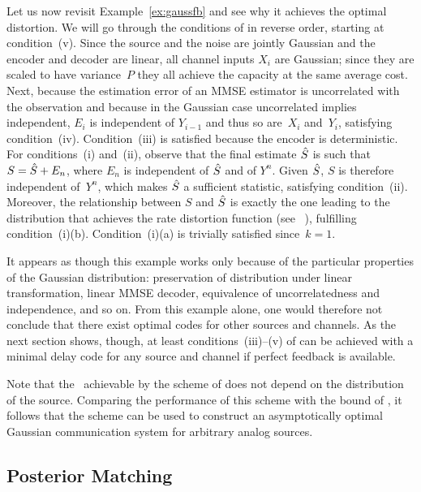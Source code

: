Let us now revisit Example~\ref{ex:gaussfb} and see why it achieves the optimal
distortion. We will go through the conditions of 
in reverse order, starting at condition~(v). Since the source and the noise are
jointly Gaussian and the encoder and decoder are linear, all channel inputs
$X_i$ are Gaussian; since they are scaled to have variance~$P$ they all achieve
the capacity at the same average cost. Next, because the estimation error of an
MMSE estimator is uncorrelated with the observation and because in the Gaussian
case uncorrelated implies independent, $E_i$ is independent of $Y_{i-1}$ and
thus so are~$X_i$ and~$Y_i$, satisfying condition~(iv). Condition~(iii) is
satisfied because the encoder is deterministic. For conditions~(i) and~(ii),
observe that the final estimate ${\hat{S}}$ is such that $S = {\hat{S}} + E_n$, where $E_n$
is independent of ${\hat{S}}$ and of $Y^n$. Given ${\hat{S}}$, $S$ is therefore independent
of~$Y^n$, which makes ${\hat{S}}$ a sufficient statistic, satisfying condition~(ii).
Moreover, the relationship between $S$ and ${\hat{S}}$ is exactly the one leading to
the distribution that achieves the rate distortion function (see
\eg~\cite[Theorem~10.3.2]{CoverT1991}), fulfilling condition~(i)(b).
Condition~(i)(a) is trivially satisfied since~$k=1$.

It appears as though this example works only because of the particular
properties of the Gaussian distribution: preservation of distribution under
linear transformation, linear MMSE decoder, equivalence of uncorrelatedness and
independence, and so on. From this example alone, one would therefore not
conclude that there exist optimal codes for other sources and channels. As the
next section shows, though, at least conditions~(iii)--(v) of 
can be achieved with a minimal delay code for any source and channel if perfect
feedback is available.

\begin{remark}
  \label{rem:lmmse}
  Note that the \sdr\ achievable by the scheme of  does not
  depend on the distribution of the source. Comparing the performance of this
  scheme with the bound of , it follows that the scheme can be
  used to construct an asymptotically optimal Gaussian communication system for
  arbitrary analog sources.
\end{remark}

\subsection{Posterior Matching}

